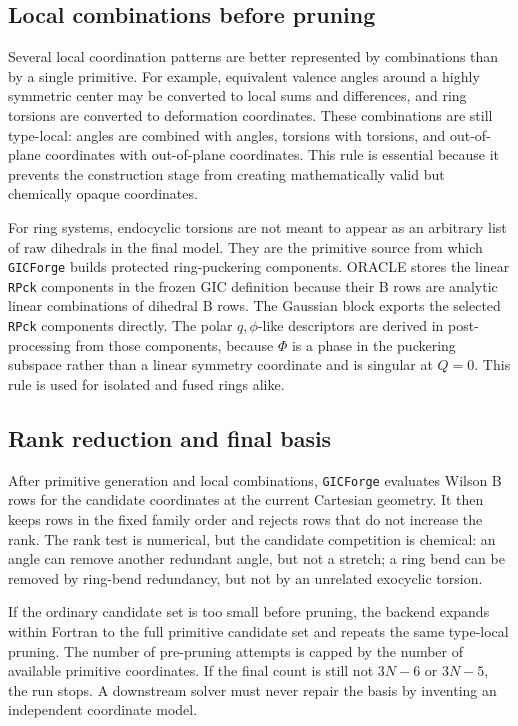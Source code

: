 \documentclass[11pt]{article}
\newcommand{\program}{\texttt{GICForge}}
\begin{document}
\subsection{Local combinations before pruning}

Several local coordination patterns are better represented by combinations than
by a single primitive.  For example, equivalent valence angles around a highly
symmetric center may be converted to local sums and differences, and ring
torsions are converted to deformation coordinates.  These combinations are
still type-local: angles are combined with angles, torsions with torsions, and
out-of-plane coordinates with out-of-plane coordinates.  This rule is essential
because it prevents the construction stage from creating mathematically valid
but chemically opaque coordinates.

For ring systems, endocyclic torsions are not meant to appear as an arbitrary
list of raw dihedrals in the final model.  They are the primitive source from
which \program{} builds protected ring-puckering components.  ORACLE stores the
linear \texttt{RPck} components in the frozen GIC definition because their B
rows are analytic linear combinations of dihedral B rows.  The Gaussian block
exports the selected \texttt{RPck} components directly.  The polar
\(q,\phi\)-like descriptors are derived in post-processing from those
components, because \(\Phi\) is a phase in the puckering subspace rather than a
linear symmetry coordinate and is singular at \(Q=0\).  This rule is used for
isolated and fused rings alike.

\subsection{Rank reduction and final basis}

After primitive generation and local combinations, \program{} evaluates Wilson
B rows for the candidate coordinates at the current Cartesian geometry.  It then
keeps rows in the fixed family order and rejects rows that do not increase the
rank.  The rank test is numerical, but the candidate competition is chemical:
an angle can remove another redundant angle, but not a stretch; a ring bend can
be removed by ring-bend redundancy, but not by an unrelated exocyclic torsion.

If the ordinary candidate set is too small before pruning, the backend expands
within Fortran to the full primitive candidate set and repeats the same
type-local pruning.  The number of pre-pruning attempts is capped by the number
of available primitive coordinates.  If the final count is still not \(3N-6\)
or \(3N-5\), the run stops.  A downstream solver must never repair the basis by
inventing an independent coordinate model.
\end{document}
